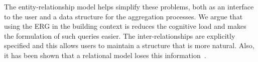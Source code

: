 
The entity-relationship model helps simplify these problems, both as an interface to the user and a data structure for the aggregation processes.  
We argue that using the ERG in the building context is reduces the cognitive load and makes the formulation
of such queries easier.  The inter-relationships are explicitly specified and this allows users to 
maintain a structure that is more natural.  Also, it has been shown that a relational model loses this 
information~\cite{SenkoDB}.






